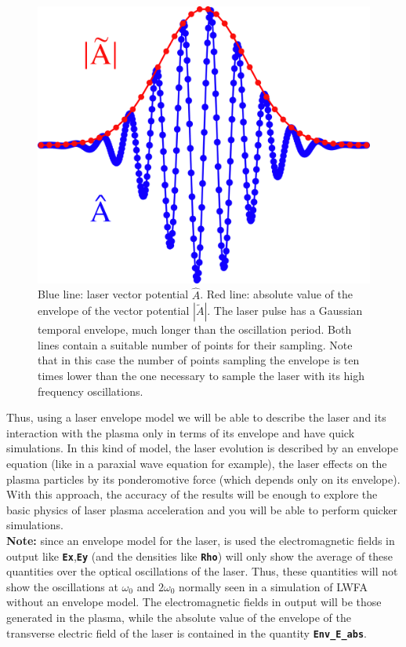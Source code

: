 \documentclass{article}
\newcommand{\commandline}[1]{\texttt{\textbf{#1}}}
\begin{document}
\begin{figure}[h!]
  \begin{center}
  \includegraphics[scale=0.4]{Envelope_Figure.png}
  \end{center}
  \caption{Blue line: laser vector potential $\hat{A}$. Red line: absolute value of the envelope of the vector potential $|\tilde{A}|$. The laser pulse has a Gaussian temporal envelope, much longer than the oscillation period. Both lines contain a suitable number of points for their sampling. Note that in  this case the number of points sampling the envelope is ten times lower than the one necessary to sample the laser with its high frequency oscillations.}
  \label{fig:envelope}
\end{figure}


Thus, using a laser envelope model we will be able to describe the laser and its interaction with the plasma only in terms of its envelope and have quick simulations. In this kind of model, the laser evolution is described by an envelope equation (like in a paraxial wave equation for example), the laser effects on the plasma particles by its ponderomotive force (which depends only on its envelope). With this approach, the accuracy of the results will be enough to explore the basic physics of laser plasma acceleration and you will be able to perform quicker simulations. \\

\textbf{ Note:} since an envelope model for the laser, is used the electromagnetic fields in output like \commandline{Ex},\commandline{Ey} (and the densities like \commandline{Rho}) will only show the average of these quantities over the optical oscillations of the laser. Thus, these quantities will not show the oscillations at $\omega_0$ and $2\omega_0$ normally seen in a simulation of LWFA without an envelope model. The electromagnetic fields in output will be those generated in the plasma, while the absolute value of the envelope of the transverse electric field of the laser is contained in the quantity \commandline{Env\_E\_abs}. \\
\end{document}
